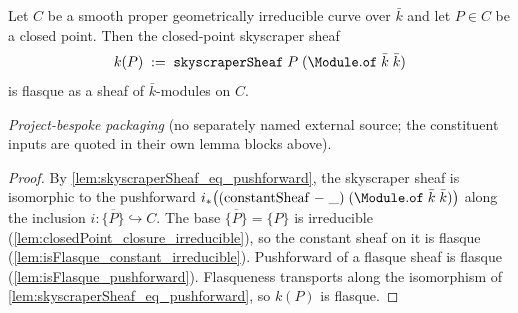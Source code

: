 \begin{lemma}

  \label{lem:skyscraperSheaf_isFlasque}

  Let \(C\) be a smooth proper geometrically irreducible curve over
  \(\bar k\) and let \(P \in C\) be a closed point. Then the
  closed-point skyscraper sheaf
  \[
    k(P) \;:=\; \mathtt{skyscraperSheaf}\;P\;
      (\Module.\mathtt{of}\;\bar k\;\bar k)
  \]
  is flasque as a sheaf of \(\bar k\)-modules on \(C\).

  \textit{Project-bespoke packaging} (no separately named external
  source; the constituent inputs are quoted in their own lemma blocks
  above).
\end{lemma}

\begin{proof}
  \leanok
  By
  \cref{lem:skyscraperSheaf_eq_pushforward}, the skyscraper sheaf is
  isomorphic to the pushforward
  \(i_*\bigl((\mathrm{constantSheaf}\;{-}\;\_)\;
  (\Module.\mathtt{of}\;\bar k\;\bar k)\bigr)\) along the inclusion
  \(i \colon \overline{\{P\}} \hookrightarrow C\). The base
  \(\overline{\{P\}} = \{P\}\) is irreducible
  (\cref{lem:closedPoint_closure_irreducible}), so the constant sheaf on
  it is flasque (\cref{lem:isFlasque_constant_irreducible}). Pushforward
  of a flasque sheaf is flasque
  (\cref{lem:isFlasque_pushforward}). Flasqueness transports along the
  isomorphism of \cref{lem:skyscraperSheaf_eq_pushforward}, so
  \(k(P)\) is flasque.
\end{proof}

